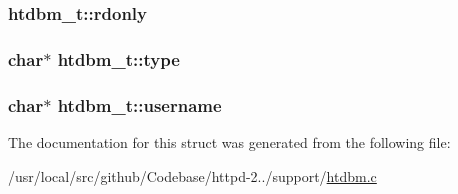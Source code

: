 \subsubsection[{\texorpdfstring{rdonly}{rdonly}}]{ htdbm\+\_\+t\+::rdonly}\hypertarget{structhtdbm__t_a74269b1cd8fc1e62a655c89a0d328fa1}{}\label{structhtdbm__t_a74269b1cd8fc1e62a655c89a0d328fa1}
\subsubsection[{\texorpdfstring{type}{type}}]{\setlength{\rightskip}{0pt plus 5cm}char$\ast$ htdbm\+\_\+t\+::type}\hypertarget{structhtdbm__t_a069978739410de95a850685eb3780c11}{}\label{structhtdbm__t_a069978739410de95a850685eb3780c11}
\subsubsection[{\texorpdfstring{username}{username}}]{\setlength{\rightskip}{0pt plus 5cm}char$\ast$ htdbm\+\_\+t\+::username}\hypertarget{structhtdbm__t_af3d5a56ebe3bcaeef251f263e0920f04}{}\label{structhtdbm__t_af3d5a56ebe3bcaeef251f263e0920f04}


The documentation for this struct was generated from the following file\+:\begin{DoxyCompactItemize}
\item 
/usr/local/src/github/\+Codebase/httpd-\/2../support/\hyperlink{htdbm_8c}{htdbm.\+c}\end{DoxyCompactItemize}
